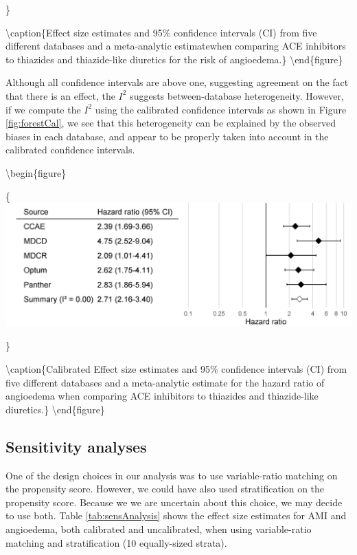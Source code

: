 \documentclass[11pt]{book}
\begin{document}
\}

\textbackslash{}caption\{Effect size estimates and 95\% confidence
intervals (CI) from five different databases and a meta-analytic
estimatewhen comparing ACE inhibitors to thiazides and thiazide-like
diuretics for the risk of angioedema.\}\label{fig:forest}
\textbackslash{}end\{figure\}

Although all confidence intervals are above one, suggesting agreement on
the fact that there is an effect, the \(I^2\) suggests between-database
heterogeneity. However, if we compute the \(I^2\) using the calibrated
confidence intervals as shown in Figure \ref{fig:forestCal}, we see that
this heterogeneity can be explained by the observed biases in each
database, and appear to be properly taken into account in the calibrated
confidence intervals.

\textbackslash{}begin\{figure\}

\{\centering \includegraphics[width=0.9\linewidth]{images/MethodValidity/forestCal}

\}

\textbackslash{}caption\{Calibrated Effect size estimates and 95\%
confidence intervals (CI) from five different databases and a
meta-analytic estimate for the hazard ratio of angioedema when comparing
ACE inhibitors to thiazides and thiazide-like
diuretics.\}\label{fig:forestCal} \textbackslash{}end\{figure\}

\subsection{Sensitivity analyses}\label{sensitivity-analyses-1}

One of the design choices in our analysis was to use variable-ratio
matching on the propensity score. However, we could have also used
stratification on the propensity score. Because we we are uncertain
about this choice, we may decide to use both. Table
\ref{tab:sensAnalysis} shows the effect size estimates for AMI and
angioedema, both calibrated and uncalibrated, when using variable-ratio
matching and stratification (10 equally-sized strata).
\end{document}
